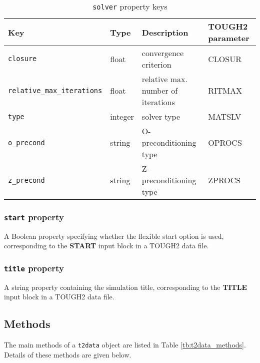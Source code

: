 \begin{table}
  \begin{center}
    \begin{tabular}{|l|l|l|l|}
      \hline
      \textbf{Key} & \textbf{Type} & \textbf{Description} & \textbf{TOUGH2 parameter}\\
      \hline
      \texttt{closure} & float & convergence criterion & CLOSUR\\
      \texttt{relative\_max\_iterations} & float & relative max. number of iterations & RITMAX\\
      \texttt{type} & integer & solver type & MATSLV\\
      \texttt{o\_precond} & string & O-preconditioning type & OPROCS\\
      \texttt{z\_precond} & string & Z-preconditioning type & ZPROCS\\
      \hline
    \end{tabular}
    \caption{\texttt{solver} property keys}
    \label{tb:solver}
  \end{center}
\end{table}

\subsubsection{\texttt{start} property}

A Boolean property specifying whether the flexible start option is used, corresponding to the \textbf{START} input block in a TOUGH2 data file.

\subsubsection{\texttt{title} property}

A string property containing the simulation title, corresponding to the \textbf{TITLE} input block in a TOUGH2 data file.

\subsection{Methods}

The main methods of a \texttt{t2data} object are listed in Table \ref{tb:t2data_methods}.  Details of these methods are given below.

